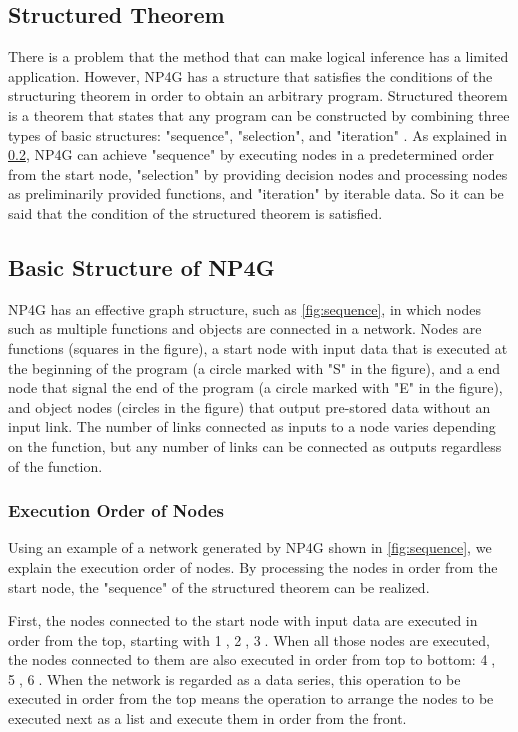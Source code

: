 \documentclass{article}
\begin{document}
\subsection {Structured Theorem}
There is a problem that the method that can make logical inference has a limited application.
However, NP4G has a structure that satisfies the conditions of the structuring theorem in order to obtain an arbitrary program.
Structured theorem is a theorem that states that any program can be constructed by combining three types of basic structures: "sequence", "selection", and "iteration" \cite{StructuredProgramming}.
As explained in \ref{sec:struct}, NP4G can achieve "sequence" by executing nodes in a predetermined order from the start node, "selection" by providing decision nodes and processing nodes as preliminarily provided functions, and "iteration" by iterable data. So it can be said that the condition of the structured theorem is satisfied.

\subsection{Basic Structure of NP4G}
\label{sec:struct}
NP4G has an effective graph structure, such as \ref{fig:sequence}, in which nodes such as multiple functions and objects are connected in a network.
Nodes are functions (squares in the figure), a start node with input data that is executed at the beginning of the program (a circle marked with "S" in the figure), and a end node that signal the end of the program (a circle marked with "E" in the figure), and object nodes (circles in the figure) that output pre-stored data without an input link.
The number of links connected as inputs to a node varies depending on the function, but any number of links can be connected as outputs regardless of the function.

\subsubsection {Execution Order of Nodes}
\label{sec:sequence}
Using an example of a network generated by NP4G shown in \ref{fig:sequence}, we explain the execution order of nodes.
By processing the nodes in order from the start node, the "sequence" of the structured theorem can be realized.

First, the nodes connected to the start node with input data are executed in order from the top, starting with \textcircled{\scriptsize 1}, \textcircled{\scriptsize 2}, \textcircled{\scriptsize 3}.
When all those nodes are executed, the nodes connected to them are also executed in order from top to bottom: \textcircled{\scriptsize 4}, \textcircled{\scriptsize 5}, \textcircled{\scriptsize 6}.
When the network is regarded as a data series, this operation to be executed in order from the top means the operation to arrange the nodes to be executed next as a list and execute them in order from the front.
\end{document}
